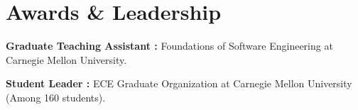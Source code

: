 \documentclass[letterpaper]{article}
\newcommand{\shortSection}[1]{
    \vspace{-6pt}
    \section{#1}
}
\newcommand*{\skill}[2]{
  \textbf{#1 : }#2 \\
  \vspace{1pt}
}
\begin{document}
\shortSection{Awards \& Leadership}
\skill{Graduate Teaching Assistant}{Foundations of Software Engineering at Carnegie Mellon University.}
\skill{Student Leader}{ECE Graduate Organization at Carnegie Mellon University (Among 160 students).}
\end{document}
